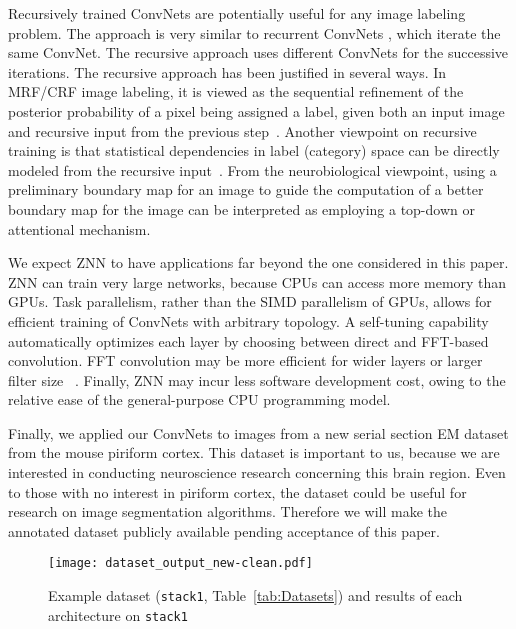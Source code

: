 \documentclass{article} %
\begin{document}
Recursively trained ConvNets are potentially useful for any image labeling
problem.  The approach is very similar to recurrent ConvNets
\cite{Pinheiro2014}, which iterate the same ConvNet.  The recursive
approach uses different ConvNets for the successive iterations. The
recursive approach has been justified in several ways. In MRF/CRF
image labeling, it is viewed as the sequential refinement of the
posterior probability of a pixel being assigned a label, given both an
input image and recursive input from the previous
step~\cite{Tu2008}. Another viewpoint on recursive training is that
statistical dependencies in label (category) space can be directly
modeled from the recursive input~\cite{Huang2014}.  From the
neurobiological viewpoint, using a preliminary boundary map for an
image to guide the computation of a better boundary map for the image
can be interpreted as employing a top-down or attentional mechanism.

We expect ZNN to have applications far beyond the one considered in
this paper.  ZNN can train very large networks, because CPUs can
access more memory than GPUs. Task parallelism, rather than
the SIMD parallelism of GPUs, allows for efficient training of
ConvNets with arbitrary topology. A self-tuning capability
automatically optimizes each layer by choosing between direct and
FFT-based convolution.  FFT convolution may be more efficient for
wider layers or larger filter size
~\cite{Mathieu2014,Vasilache2015}. Finally, ZNN may incur less
software development cost, owing to the relative ease of the
general-purpose CPU programming model.

Finally, we applied our ConvNets to images from a new serial section
EM dataset from the mouse piriform cortex.  This dataset is important
to us, because we are interested in conducting neuroscience research
concerning this brain region.  Even to those with no interest in
piriform cortex, the dataset could be useful for research on image
segmentation algorithms.  Therefore we will make the annotated dataset
publicly available pending acceptance of this paper.



\begin{figure}[b]
\begin{center}
\texttt{[image: dataset\_output\_new-clean.pdf]}
\end{center}
\caption{Example dataset (\texttt{stack1}, Table~\ref{tab:Datasets}) and results of each architecture on \texttt{stack1}}
\label{dataset}
\end{figure}
\end{document}
